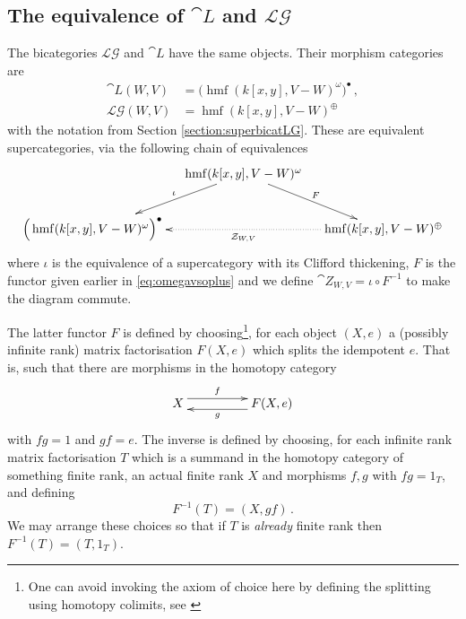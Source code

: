 \documentclass[english,letter paper,12pt,leqno]{article}
\theoremstyle{example}
\numberwithin{equation}{section}
\def\LG{\mathcal{LG}}
\def\be{\begin{equation}}
\def\ee{\end{equation}}
\DeclareMathOperator{\hmf}{hmf}
\begin{document}
\subsection{The equivalence of $\cat{L}$ and $\LG$}\label{section:equivalenceforreal}

The bicategories $\LG$ and $\cat{L}$ have the same objects. Their morphism categories are 
\begin{align*}
\cat{L}(W,V) &= \Big( \hmf( k[x,y], V - W )^{\omega} \Big)^{\bullet}\,,\\
\LG(W,V) &= \hmf( k[x,y], V - W )^{\oplus}
\end{align*}
with the notation from Section \ref{section:superbicatLG}. These are equivalent supercategories, via the following chain of equivalences
\be
\xymatrix@C-1pc{
& \ar[dl]_-{\iota}\hmf( k[x,y], V - W )^{\omega}\ar[dr]^-{F}\\
\Big( \hmf( k[x,y], V - W )^{\omega} \Big)^{\bullet} &  & \hmf( k[x,y], V - W )^{\oplus}\ar@{.>}[ll]^-{\cat{Z}_{W,V}}
}
\ee
where $\iota$ is the equivalence of a supercategory with its Clifford thickening, $F$ is the functor given earlier in \eqref{eq:omegavsoplus} and we define $\cat{Z}_{W,V} = \iota \circ F^{-1}$ to make the diagram commute. 

The latter functor $F$ is defined by choosing\footnote{One can avoid invoking the axiom of choice here by defining the splitting using homotopy colimits, see \cite{??}}, for each object $(X,e)$ a (possibly infinite rank) matrix factorisation $F(X,e)$ which splits the idempotent $e$. That is, such that there are morphisms in the homotopy category
\[
\xymatrix@C+2pc{
X \ar@<1ex>[r]^-{f} & F(X,e) \ar@<1ex>[l]^-{g}
}
\]
with $f g = 1$ and $gf = e$. The inverse is defined by choosing, for each infinite rank matrix factorisation $T$ which is a summand in the homotopy category of something finite rank, an actual finite rank $X$ and morphisms $f,g$ with $fg = 1_T$, and defining
\[
F^{-1}(T) = (X,gf)\,.
\]
We may arrange these choices so that if $T$ is \emph{already} finite rank then $F^{-1}(T) = (T, 1_T)$.
\end{document}
